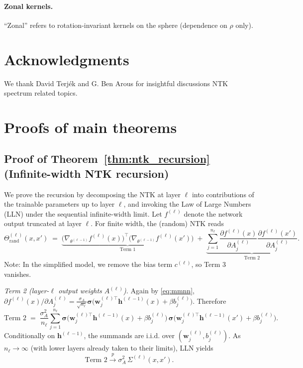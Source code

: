\documentclass{article}
\DeclareRobustCommand{\ReLU}{\mathrel{\boldsymbol{\sigma}}}
\begin{document}
\paragraph{Zonal kernels.} “Zonal” refers to rotation-invariant kernels on the sphere (dependence on \( \rho \) only).

\section*{Acknowledgments}
We thank David Terjék and G. Ben Arous for insightful discussions NTK spectrum related topics.

\appendix

\vspace{2em}
\section{Proofs of main theorems}

\vspace{1em}
\subsection{Proof of Theorem~\ref{thm:ntk_recursion} (Infinite-width NTK recursion)}\label{appendix:proof-ntk-recursion}
We prove the recursion by decomposing the NTK at layer \( \ell \) into contributions of the trainable parameters up to layer \( \ell \), and invoking the Law of Large Numbers (LLN) under the sequential infinite-width limit. Let \( f^{(\ell)} \) denote the network output truncated at layer \( \ell \). For finite width, the (random) NTK reads
\[
\Theta^{(\ell)}_{\mathrm{rand}}(x,x') \;=\; \underbrace{\big(\nabla_{\theta^{(\ell-1)}} f^{(\ell)}(x)\big)^\top \big(\nabla_{\theta^{(\ell-1)}} f^{(\ell)}(x')\big)}_{\text{Term 1}} \;+\; \underbrace{\sum_{j=1}^{n_\ell}\frac{\partial f^{(\ell)}(x)}{\partial A^{(\ell)}_j}\frac{\partial f^{(\ell)}(x')}{\partial A^{(\ell)}_j}}_{\text{Term 2}}.
\]
Note: In the simplified model, we remove the bias term \( c^{(\ell)} \), so Term 3 vanishes.

\emph{Term 2 (layer-$\ell$ output weights $A^{(\ell)}$).} Again by \eqref{eq:mmnn}, $\partial f^{(\ell)}(x)/\partial A^{(\ell)}_j = \frac{\sigma_A}{\sqrt{n_\ell}}\ReLU\!\big(\bm{w}^{(\ell)\top}_j\bm{h}^{(\ell-1)}(x)+\beta b^{(\ell)}_j\big)$. Therefore
\[
\text{Term 2} \;=\; \frac{\sigma_A^2}{n_\ell}\sum_{j=1}^{n_\ell} \ReLU\!\big(\bm{w}^{(\ell)\top}_j\bm{h}^{(\ell-1)}(x)+\beta b^{(\ell)}_j\big)\,\ReLU\!\big(\bm{w}^{(\ell)\top}_j\bm{h}^{(\ell-1)}(x')+\beta b^{(\ell)}_j\big).
\]
Conditionally on $\bm{h}^{(\ell-1)}$, the summands are i.i.d. over $(\bm{w}^{(\ell)}_j,b^{(\ell)}_j)$. As $n_\ell\to\infty$ (with lower layers already taken to their limits), LLN yields
\[
\text{Term 2} \xrightarrow{p} \sigma_A^2\,\Sigma^{(\ell)}(x,x').
\]
\end{document}
